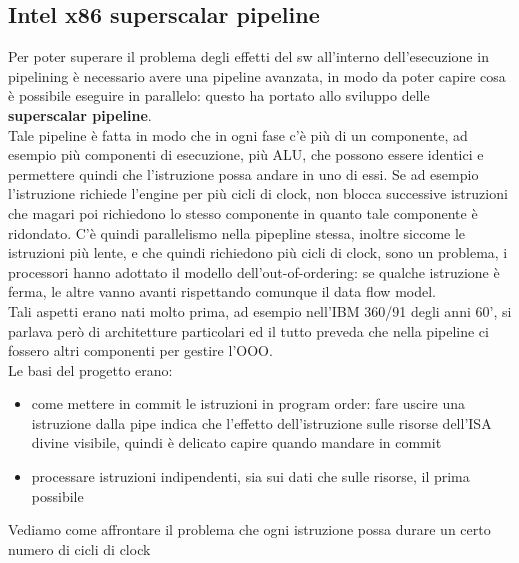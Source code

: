 \documentclass[12pt, oneside]{extbook}
\begin{document}
\subsection{Intel x86 superscalar pipeline}
Per poter superare il problema degli effetti del sw all'interno dell'esecuzione in pipelining è necessario avere una  pipeline avanzata, in modo da poter capire cosa è possibile eseguire in parallelo: questo ha portato allo sviluppo delle \textbf{superscalar pipeline}.\\  Tale pipeline è fatta in modo che in ogni fase c'è più di un componente, ad esempio più componenti di esecuzione, più ALU, che possono essere identici e permettere quindi che l'istruzione possa andare in uno di essi. Se ad esempio l'istruzione richiede l'engine per più cicli di clock, non blocca successive istruzioni che magari poi richiedono lo stesso componente in quanto tale componente è ridondato. C'è quindi parallelismo nella pipepline stessa, inoltre siccome le istruzioni più lente, e che quindi richiedono più cicli di clock, sono un problema, i processori hanno adottato il modello dell'out-of-ordering: se qualche istruzione è ferma, le altre vanno avanti rispettando comunque il data flow model.\\ Tali aspetti erano nati molto prima, ad esempio nell'IBM 360/91 degli anni 60', si parlava però di architetture particolari ed il tutto preveda che nella pipeline ci fossero altri componenti per gestire l'OOO.\\ Le basi del progetto erano:
\begin{itemize}
\item come mettere in commit le istruzioni in program order: fare uscire una istruzione dalla pipe indica che l'effetto dell'istruzione sulle risorse dell'ISA divine visibile, quindi è delicato capire quando mandare in commit
\item processare istruzioni indipendenti, sia sui dati che sulle risorse, il prima possibile
\end{itemize}
Vediamo come affrontare il problema che ogni istruzione possa durare un certo numero di cicli di clock
\end{document}
